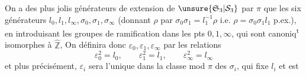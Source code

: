 On a des plus jolis générateurs de  extension de $\unsure{\mathfrak S_3|\mathcal S_3}$ par $\pi$  que les six générateurs $l_0,l_1,l_\infty,\sigma_0,\sigma_1,\sigma_\infty$ (donnant $\rho$ par $\sigma_0\sigma_1=l_1^{-1}\rho$  i.e. $\rho=\sigma_0\sigma_1l_1$ p.ex.), en introduisant les groupes de ramification dans les pts $0,1,\infty$, qui sont canoniq\textsuperscript{t} isomorphes à $\widehat{\mathbb Z}$,
On définira donc $\varepsilon_0,\varepsilon_1,\varepsilon_\infty$ par les relations
\[
\varepsilon_0^2=l_0,\qquad\varepsilon_1^2=l_1,\qquad\varepsilon_\infty^2=l_\infty
\]
et plus précisément, $\varepsilon_i$ sera l'unique   dans la classe mod $\pi$ des $\sigma_i$,  qui fixe $l_i$ et est  

